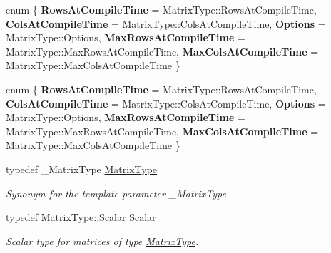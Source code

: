 \begin{DoxyCompactItemize}
\item 
\mbox{\label{group___eigenvalues___module_aabb8edeaace500955fdc10447981c0bb}} 
enum \{ \newline
{\bfseries Rows\+At\+Compile\+Time} = Matrix\+Type\+:\+:Rows\+At\+Compile\+Time, 
{\bfseries Cols\+At\+Compile\+Time} = Matrix\+Type\+:\+:Cols\+At\+Compile\+Time, 
{\bfseries Options} = Matrix\+Type\+:\+:Options, 
{\bfseries Max\+Rows\+At\+Compile\+Time} = Matrix\+Type\+:\+:Max\+Rows\+At\+Compile\+Time, 
\newline
{\bfseries Max\+Cols\+At\+Compile\+Time} = Matrix\+Type\+:\+:Max\+Cols\+At\+Compile\+Time
 \}
\item 
\mbox{\label{group___eigenvalues___module_ade0dd1952bf2eb9a6c679e4b23e36f5f}} 
enum \{ \newline
{\bfseries Rows\+At\+Compile\+Time} = Matrix\+Type\+:\+:Rows\+At\+Compile\+Time, 
{\bfseries Cols\+At\+Compile\+Time} = Matrix\+Type\+:\+:Cols\+At\+Compile\+Time, 
{\bfseries Options} = Matrix\+Type\+:\+:Options, 
{\bfseries Max\+Rows\+At\+Compile\+Time} = Matrix\+Type\+:\+:Max\+Rows\+At\+Compile\+Time, 
\newline
{\bfseries Max\+Cols\+At\+Compile\+Time} = Matrix\+Type\+:\+:Max\+Cols\+At\+Compile\+Time
 \}
\item 
\mbox{\label{group___eigenvalues___module_a56f4b9823bb9a267de3aaf48428cd247}} 
typedef \+\_\+\+Matrix\+Type \hyperlink{group___eigenvalues___module_a56f4b9823bb9a267de3aaf48428cd247}{Matrix\+Type}
\begin{DoxyCompactList}\small\item\em Synonym for the template parameter {\ttfamily \+\_\+\+Matrix\+Type}. \end{DoxyCompactList}\item 
\mbox{\label{group___eigenvalues___module_afb318d0b097ff8dd5a7410d31317ca47}} 
typedef Matrix\+Type\+::\+Scalar \hyperlink{group___eigenvalues___module_afb318d0b097ff8dd5a7410d31317ca47}{Scalar}
\begin{DoxyCompactList}\small\item\em Scalar type for matrices of type \hyperlink{group___eigenvalues___module_a56f4b9823bb9a267de3aaf48428cd247}{Matrix\+Type}. \end{DoxyCompactList}\item 

\end{DoxyCompactItemize}
